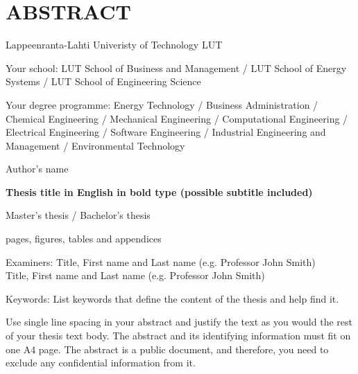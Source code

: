 \chapter*{ABSTRACT}

Lappeenranta-Lahti Univeristy of Technology LUT

Your school: LUT School of Business and Management / LUT School of Energy Systems / LUT School of Engineering Science

Your degree programme: Energy Technology / Business Administration / Chemical Engineering / Mechanical Engineering / Computational Engineering / Electrical Engineering / Software Engineering / Industrial Engineering and Management / Environmental Technology

\hspace{1em}

Author's name

\hspace{1em}

\textbf{Thesis title in English in bold type (possible subtitle included)}

\hspace{1em}

Master’s thesis / Bachelor's thesis

\the\year{}

 pages,   figures,  tables and  appendices

\begin{flushleft}
    Examiners: Title, First name and Last name (e.g. Professor John Smith)\\
	\hspace{19.5mm} Title, First name and Last name (e.g. Professor John Smith)\\
\end{flushleft}

Keywords: List keywords that define the content of the thesis and help find it.

\hspace{1em}

Use single line spacing in your abstract and justify the text as you would the rest of your thesis text body. The abstract and its identifying information must fit on one A4 page. The abstract is a public document, and therefore, you need to exclude any confidential information from it.

